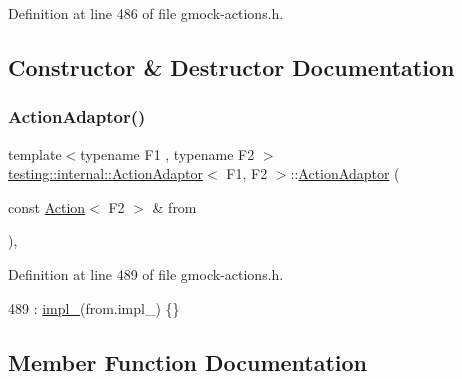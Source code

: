 Definition at line 486 of file gmock-\/actions.\+h.



\subsection{Constructor \& Destructor Documentation}
\mbox{\label{classtesting_1_1internal_1_1ActionAdaptor_a24ba3330ef3cc365b956c50ec73e4177}} 
\subsubsection{\texorpdfstring{Action\+Adaptor()}{ActionAdaptor()}}
{\footnotesize\ttfamily template$<$typename F1 , typename F2 $>$ \\
\hyperlink{classtesting_1_1internal_1_1ActionAdaptor}{testing\+::internal\+::\+Action\+Adaptor}$<$ F1, F2 $>$\+::\hyperlink{classtesting_1_1internal_1_1ActionAdaptor}{Action\+Adaptor} (\begin{DoxyParamCaption}\item[{const \hyperlink{classtesting_1_1Action}{Action}$<$ F2 $>$ \&}]{from }\end{DoxyParamCaption})\hspace{0.3cm}{\ttfamily [inline]}, {\ttfamily [explicit]}}



Definition at line 489 of file gmock-\/actions.\+h.


\begin{DoxyCode}
489 : \hyperlink{classtesting_1_1internal_1_1ActionAdaptor_a555b8bc3e770b9a0d824be1ee2403783}{impl\_}(from.impl\_) \{\}
\end{DoxyCode}


\subsection{Member Function Documentation}
\mbox{\label{classtesting_1_1internal_1_1ActionAdaptor_ad46465f82ccd055324fa267308c2753e}} 
